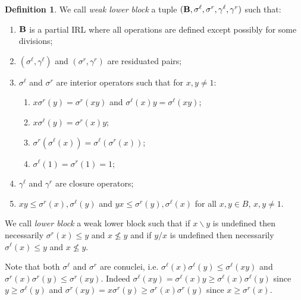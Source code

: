 \documentclass{amsart}
\theoremstyle{definition}
\newtheorem{definition}[theorem]{Definition}
\numberwithin{equation}{section}
\newcommand{\alg}[1]{{\textbf{\upshape #1}}}  %
\newcommand{\sell}{\sigma^\ell}
\newcommand{\sr}{\sigma^r}
\newcommand{\gell}{\gamma^\ell}
\newcommand{\gr}{\gamma^r}
\begin{document}
	\begin{definition} \label{def: lower block}
		We call {\em weak lower block} a tuple $(\alg B, \sell, \sr, \gell, \gr)$ such that: 
		\begin{enumerate}
			\item $\alg B$ is a partial IRL where all operations are defined except possibly for some divisions; 
			\item $(\sell, \gell)$ and $(\sr,\gr)$ are residuated pairs;
			\item  $\sell$ and $\sr$ are interior operators such that for $x, y \neq 1$:
				\begin{enumerate}
				\item $x\sr(y)=\sr(xy)$ and $\sell(x)y=\sell(xy)$;
				\item $x\sell(y)=\sr(x)y$;
				\item $\sr(\sell(x))=\sell(\sr(x))$;
				\item $\sell(1)=\sr(1)=1$;
				\end{enumerate}
			
				\item $\gell$ and $\gr$ are closure operators; 
				\item $xy \leq \sr(x), \sell(y)$ and $yx\leq \sr(y), \sell(x)$ for all $x,y \in B$, $x,y \neq 1$.
		\end{enumerate}
		We call {\em lower block} a weak lower block such that if $x \backslash y$ is undefined then necessarily $\sr(x)\leq y$ and $x \not \leq y$ and if $y / x$ is undefined then necessarily $\sell(x)\leq y$ and $x \not \leq y$.
	\end{definition}
	Note that both $\sell$ and $\sr$ are conuclei, i.e. $\sell(x)\sell(y)\leq \sell(xy)$ and $\sr(x)\sr(y)\leq \sr(xy)$. Indeed $\sell(xy)=\sell(x)y \geq \sell(x)\sell(y)$ since $y \geq \sell(y)$ and $\sr(xy)=x \sr(y)\geq \sr(x)\sr(y)$ since $x \geq \sr(x)$. 
\end{document}
